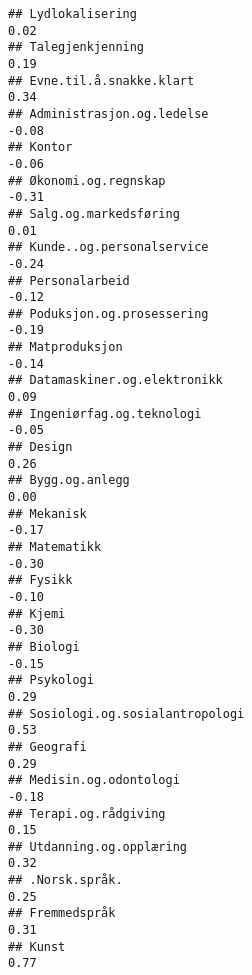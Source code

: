 \documentclass[
]{article}
\begin{document}
\begin{verbatim}
## Lydlokalisering                                                                   0.02
## Talegjenkjenning                                                                  0.19
## Evne.til.å.snakke.klart                                                           0.34
## Administrasjon.og.ledelse                                                        -0.08
## Kontor                                                                           -0.06
## Økonomi.og.regnskap                                                              -0.31
## Salg.og.markedsføring                                                             0.01
## Kunde..og.personalservice                                                        -0.24
## Personalarbeid                                                                   -0.12
## Poduksjon.og.prosessering                                                        -0.19
## Matproduksjon                                                                    -0.14
## Datamaskiner.og.elektronikk                                                       0.09
## Ingeniørfag.og.teknologi                                                         -0.05
## Design                                                                            0.26
## Bygg.og.anlegg                                                                    0.00
## Mekanisk                                                                         -0.17
## Matematikk                                                                       -0.30
## Fysikk                                                                           -0.10
## Kjemi                                                                            -0.30
## Biologi                                                                          -0.15
## Psykologi                                                                         0.29
## Sosiologi.og.sosialantropologi                                                    0.53
## Geografi                                                                          0.29
## Medisin.og.odontologi                                                            -0.18
## Terapi.og.rådgiving                                                               0.15
## Utdanning.og.opplæring                                                            0.32
## .Norsk.språk.                                                                     0.25
## Fremmedspråk                                                                      0.31
## Kunst                                                                             0.77

\end{verbatim}
\end{document}
